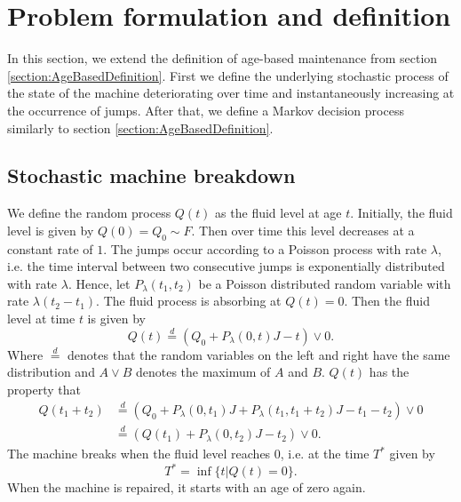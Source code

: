 \documentclass[a4paper]{thesis}
\theoremstyle{definition}
\begin{document}
\section{Problem formulation and definition}
In this section, we extend the definition of age-based maintenance from section \ref{section:AgeBasedDefinition}.
First we define the underlying stochastic process of the state of the machine deteriorating over time and instantaneously increasing at the occurrence of jumps.
After that, we define a Markov decision process similarly to section \ref{section:AgeBasedDefinition}.

\subsection{Stochastic machine breakdown}
We define the random process $Q(t)$ as the fluid level at age $t$.
Initially, the fluid level is given by $Q(0)=Q_0\sim F$.
Then over time this level decreases at a constant rate of $1$.
The jumps occur according to a Poisson process with rate $\lambda$, i.e. the time interval between two consecutive jumps is exponentially distributed with rate $\lambda$.
Hence, let $P_\lambda(t_1,t_2)$ be a Poisson distributed random variable with rate $\lambda (t_2-t_1)$.
The fluid process is absorbing at $Q(t)=0$.
Then the fluid level at time $t$ is given by 
\[
Q(t)\stackrel d=(Q_0+P_\lambda(0,t)J-t)\vee 0.
\]
Where $\stackrel d=$ denotes that the random variables on the left and right have the same distribution and $A\vee B$ denotes the maximum of $A$ and $B$.
$Q(t)$ has the property that
\[
\begin{split}
Q(t_1+t_2)&\stackrel d=( Q_0+P_\lambda(0,t_1)J+P_\lambda(t_1,t_1+t_2)J-t_1-t_2)\vee0\\
&\stackrel d= (Q(t_1)+P_\lambda(0,t_2)J-t_2)\vee0.
\end{split}
\]
The machine breaks when the fluid level reaches $0$, i.e. at the time $T^*$ given by
\[
T^*=\inf\{t|Q(t)=0\}.
\]
When the machine is repaired, it starts with an age of zero again.
\end{document}
